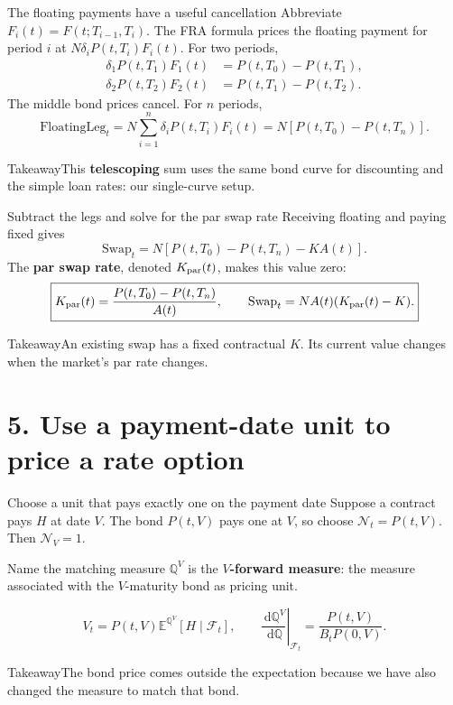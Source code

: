 \documentclass[handout,10pt,t,aspectratio=169]{beamer}
\newenvironment{keybox}{\begin{exampleblock}{Takeaway}}{\end{exampleblock}}
\newcommand{\E}{\mathbb E}
\newcommand{\Q}{\mathbb Q}
\newcommand{\F}{\mathcal F}
\newcommand{\dd}{\,\mathrm d}
\begin{document}
\begin{frame}{The floating payments have a useful cancellation}
\small
Abbreviate \(F_i(t)=F(t;T_{i-1},T_i)\). The FRA formula prices the
floating payment for period \(i\) at \(N\delta_iP(t,T_i)F_i(t)\).
For two periods,
\[
 \begin{aligned}
 \delta_1P(t,T_1)F_1(t)&=P(t,T_0)-P(t,T_1),\\
 \delta_2P(t,T_2)F_2(t)&=P(t,T_1)-P(t,T_2).
 \end{aligned}
\]
The middle bond prices cancel. For \(n\) periods,
\[
 \boxed{\mathrm{FloatingLeg}_t
 =N\sum_{i=1}^n\delta_iP(t,T_i)F_i(t)
 =N[P(t,T_0)-P(t,T_n)].}
\]
\begin{keybox}This \textbf{telescoping} sum uses the same bond curve for
discounting and the simple loan rates: our single-curve setup.\end{keybox}
\end{frame}

\begin{frame}{Subtract the legs and solve for the par swap rate}
Receiving floating and paying fixed gives
\[
 \mathrm{Swap}_t=N[P(t,T_0)-P(t,T_n)-KA(t)].
\]
The \textbf{par swap rate}, denoted \(K_{\rm par}(t)\), makes this value zero:
\[
 \boxed{K_{\rm par}(t)=\frac{P(t,T_0)-P(t,T_n)}{A(t)},
 \qquad \mathrm{Swap}_t=NA(t)(K_{\rm par}(t)-K).}
\]
\begin{keybox}An existing swap has a fixed contractual \(K\).
Its current value changes when the market's par rate changes.\end{keybox}
\end{frame}

\section{5. Use a payment-date unit to price a rate option}

\begin{frame}{Choose a unit that pays exactly one on the payment date}
Suppose a contract pays \(H\) at date \(V\). The bond \(P(t,V)\) pays one at \(V\),
so choose \(\mathcal N_t=P(t,V)\). Then \(\mathcal N_V=1\).
\begin{block}{Name the matching measure}
\(\Q^V\) is the \textbf{\(V\)-forward measure}: the measure associated
with the \(V\)-maturity bond as pricing unit.
\end{block}
\[
 \boxed{V_t=P(t,V)\E^{\Q^V}[H\mid\F_t],\qquad
 \left.\frac{\dd\Q^V}{\dd\Q}\right|_{\F_t}
 =\frac{P(t,V)}{B_tP(0,V)}.}
\]
\begin{keybox}The bond price comes outside the expectation because we have
also changed the measure to match that bond.\end{keybox}
\end{frame}
\end{document}
